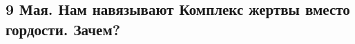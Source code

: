  
 
 
 
 

\subsection{9 Мая. Нам навязывают Комплекс жертвы вместо гордости. Зачем?}
\Purl{https://www.facebook.com/%

9 мая. День Победы.

}
